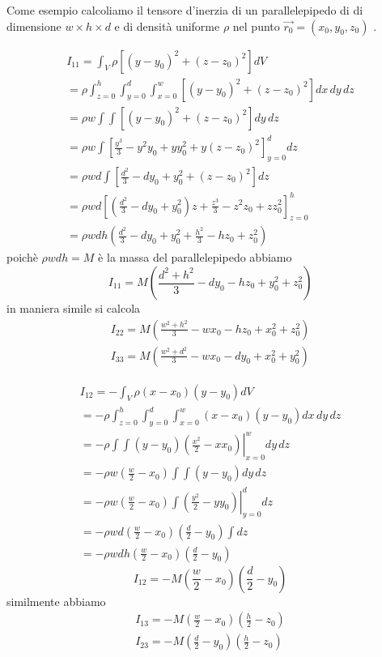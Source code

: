 \documentclass[a4paper,11pt]{article}
\begin{document}
Come esempio calcoliamo il tensore d'inerzia di un parallelepipedo di di dimensione $ w \times h \times d $ e di densità uniforme $ \rho $ nel punto $ \vec {r_0} = (x_0, y_0, z_0) $ .

\begin{eqnarray*}
	I_{11} = \int_V \rho [ (y - y_0)^2 + (z - z_0)^2] dV
\\
	= \rho \int_{z=0}^h \int_{y=0}^d \int_{x=0}^w [ (y - y_0)^2 + (z - z_0)^2] dx \, dy \, dz
\\
	= \rho w \int \int [ (y - y_0)^2 + (z - z_0)^2] dy \, dz
\\
	= \rho w \int \left[ \frac{y^3}{3} - y^2 y_0 + y y_0 ^2 + y (z - z_0)^2 \right]_{y=0}^d dz
\\
	= \rho w d \int \left[ \frac{d^2}{3} - d y_0 + y_0 ^2 + (z - z_0)^2 \right] dz
\\
	= \rho w d \left[ \left(\frac{d^2}{3} - d y_0 + y_0 ^2\right) z + \frac{z^3}{3} - z^2 z_0 + z z_0^2 \right]_{z=0}^h
\\
	= \rho w d h \left( \frac{d^2}{3} - d y_0 + y_0 ^2 + \frac{h^2}{3} - h z_0 + z_0^2 \right)
\end{eqnarray*}
poichè $\rho w d h = M $ è la massa del parallelepipedo abbiamo
\begin{equation}
	I_{11} = M \left( \frac{d^2+h^2}{3} - d y_0 - h z_0 + y_0 ^2 + z_0^2 \right)
\end{equation}
in maniera simile si calcola
\begin{eqnarray}
	I_{22} = M \left( \frac{w^2+h^2}{3} - w x_0 - h z_0 + x_0 ^2 + z_0^2 \right)
\\
	I_{33} = M \left( \frac{w^2+d^2}{3} - w x_0 - d y_0 + x_0 ^2 + y_0^2 \right)
\end{eqnarray}

\begin{eqnarray*}
	I_{12} = -\int_V \rho (x - x_0) (y - y_0) dV
\\
	= -\rho \int_{z=0}^h \int_{y=0}^d \int_{x=0}^w (x - x_0) (y - y_0) dx \, dy \, dz
\\
	= -\rho \int \int (y - y_0)  \left. \left( \frac{x^2}{2} - x x_0 \right) \right|_{x=0}^w dy \, dz
\\
	= -\rho w \left( \frac{w}{2} - x_0 \right) \int \int (y - y_0) dy \,  dz
\\
	= -\rho w \left( \frac{w}{2} - x_0 \right) \int \left. \left( \frac{y^2}{2} - y y_0 \right) \right|_{y=0}^d  dz
\\
	= -\rho w d \left( \frac{w}{2} - x_0 \right) \left( \frac{d}{2} - y_0 \right) \int  dz
\\
	= -\rho w d h \left( \frac{w}{2} - x_0 \right) \left( \frac{d}{2} - y_0 \right)
\end{eqnarray*}
\begin{equation}
	I_{12} = -M \left( \frac{w}{2} - x_0 \right) \left( \frac{d}{2} - y_0 \right)
\end{equation}
similmente abbiamo
\begin{eqnarray*}
	I_{13} = -M \left( \frac{w}{2} - x_0 \right) \left( \frac{h}{2} - z_0 \right)
\\
	I_{23} = -M \left( \frac{d}{2} - y_0 \right) \left( \frac{h}{2} - z_0 \right)
\end{eqnarray*}
\end{document}
